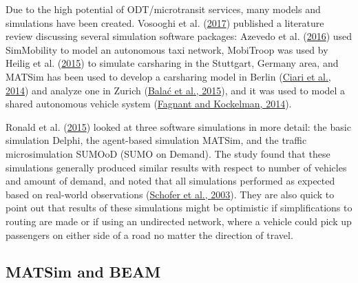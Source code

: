 \documentclass[
]{report}
\begin{document}
Due to the high potential of ODT/microtransit services, many models and simulations have been created. Vosooghi et al. (\protect\hyperlink{ref-Vosooghi2017}{2017}) published a literature review discussing several simulation software packages: Azevedo et al. (\protect\hyperlink{ref-Azevedo2016}{2016}) used SimMobility to model an autonomous taxi network, MobiTroop was used by Heilig et al. (\protect\hyperlink{ref-Heilig2015}{2015}) to simulate carsharing in the Stuttgart, Germany area, and MATSim has been used to develop a carsharing model in Berlin (\protect\hyperlink{ref-Ciari2014}{Ciari et al., 2014}) and analyze one in Zurich (\protect\hyperlink{ref-Balac2015}{Balać et al., 2015}), and it was used to model a shared autonomous vehicle system (\protect\hyperlink{ref-Fagnant2014}{Fagnant and Kockelman, 2014}).

Ronald et al. (\protect\hyperlink{ref-Ronald2015}{2015}) looked at three software simulations in more detail: the basic simulation Delphi, the agent-based simulation MATSim, and the traffic microsimulation SUMOoD (SUMO on Demand). The study found that these simulations generally produced similar results with respect to number of vehicles and amount of demand, and noted that all simulations performed as expected based on real-world observations (\protect\hyperlink{ref-Schofer2003}{Schofer et al., 2003}). They are also quick to point out that results of these simulations might be optimistic if simplifications to routing are made or if using an undirected network, where a vehicle could pick up passengers on either side of a road no matter the direction of travel.

\hypertarget{matsim-and-beam}{%
\subsection{MATSim and BEAM}\label{matsim-and-beam}}
\end{document}
